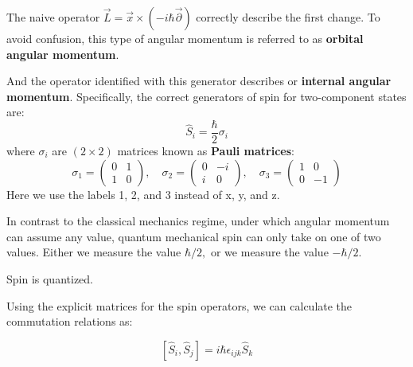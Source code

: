 \begin{mybox2}
 The naive operator $\vec{L}=\vec{x} \times(-i \hbar \vec{\partial})$ correctly describe the first change. To avoid confusion, this type of angular momentum is referred to as \textbf{orbital angular momentum}.

 And the operator identified with this generator describes \textbf{} or \textbf{internal angular momentum}. Specifically, the correct generators of spin for two-component states are:
\begin{equation}
\hat{S}_{i}=\frac{\hbar}{2} \sigma_{i}
\end{equation}
where $\sigma_{i}$ are $(2 \times 2)$ matrices known as \textbf{Pauli matrices}:
\begin{equation}
\sigma_{1}=\left(\begin{array}{cc}
{0} & {1} \\
{1} & {0}
\end{array}\right), \quad \sigma_{2}=\left(\begin{array}{cc}
{0} & {-i} \\
{i} & {0}
\end{array}\right), \quad \sigma_{3}=\left(\begin{array}{cc}
{1} & {0} \\
{0} & {-1}
\end{array}\right)
\end{equation}
Here we use the labels 1, 2, and 3 instead of x, y, and z.
\end{mybox2}
In contrast to the classical mechanics regime, under which angular momentum can assume any value, quantum mechanical spin can only take on one of two values. Either we measure the value $\hbar / 2,$ or we measure the value $-\hbar / 2$.
\begin{qt}
\begin{center}
    Spin is quantized.
\end{center}
\end{qt}
Using the explicit matrices for the spin operators, we can calculate the commutation relations as:
\begin{qt}
\begin{equation}
\left[\hat{S}_{i}, \hat{S}_{j}\right]=i \hbar \epsilon_{i j k} \hat{S}_{k}
\end{equation}
\end{qt}

